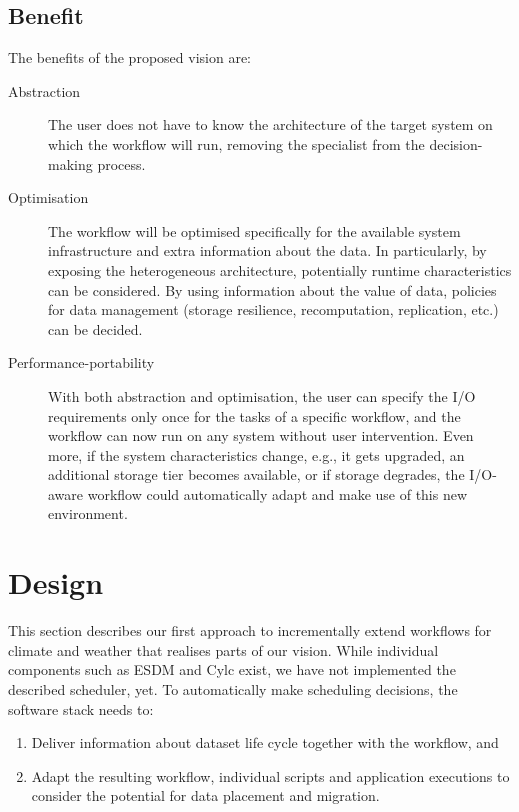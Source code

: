 \documentclass{superfri}
\begin{document}
\subsection{Benefit}

The benefits of the proposed vision are:

\begin{description}

\item[Abstraction] The user does not have to know the architecture of the target system on which the workflow will run, removing the specialist from the decision-making process.

\item[Optimisation] The workflow will be optimised specifically for the available system infrastructure and extra information about the data.
In particularly, by exposing the heterogeneous architecture, potentially runtime characteristics can be considered.
By using information about the value of data, policies for data management (storage resilience,  recomputation, replication, etc.) can be decided.

\item[Performance-portability] With both abstraction and optimisation, the user can specify the I/O requirements only once for the tasks of a specific workflow, and the workflow can now run on any system without user intervention.
Even more, if the system characteristics change, e.g., it gets upgraded, an additional storage tier becomes available, or if storage degrades, the I/O-aware workflow could automatically adapt and make use of this new environment. %

\end{description}

\section{Design}
\label{sec:design}

This section describes our first approach to incrementally extend workflows for climate and weather that realises parts of our vision.
While individual components such as ESDM and Cylc exist, we have not implemented the described scheduler, yet.
To automatically make scheduling decisions, the software stack needs to:

\begin{enumerate}

\item Deliver information about dataset life cycle together with the workflow, and

\item Adapt the resulting workflow, individual scripts and application executions to consider the potential for data placement and migration.

\end{enumerate}
\end{document}

